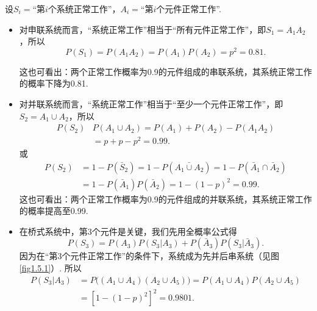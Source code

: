 \begin{solution}
    设$S_i=$“第$i$个系统正常工作”，$A_i=$“第$i$个元件正常工作”.

    \begin{itemize}[(1)]
        \item 对申联系统而言，“系统正常工作”相当于“所有元件正常工作”，即$S_1=A_1A_2$，所以
              \[
                  P(S_1) = P(A_1A_2) = P(A_1)P(A_2) = p^2 = 0.81.
              \]

              这也可看出：两个正常工作概率为0.9的元件组成的串联系统，其系统正常工作的概率下降为0.81.

        \item 对并联系统而言，“系统正常工作”相当于“至少一个元件正常工作”，即$S_2=A_1\cup A_2$，所以
              \begin{align*}
                  P(S_2) & P(A_1\cup A_2) = P(A_1) + P(A_2) - P(A_1A_2) \\
                         & = p + p - p^2 = 0.99.
              \end{align*}
              或
              \begin{align*}
                  P(S_2) & = 1 - P(\bar S_2) = 1 - P(\bar{A_1\cup A_2}) = 1 - P(\bar A_1\cap \bar A_2) \\
                         & = 1 - P(\bar A_1)P(\bar A_2) = 1 - (1-p)^2 = 0.99.
              \end{align*}
              这也可看出：两个正常工作概率为0.9的元件组成的并联系统，其系统正常工作的概率提高至0.99.

        \item 在桥式系统中，第3个元件是关键，我们先用全概率公式得
              \[
                  P(S_3) = P(A_3)P(S_3|A_3) + P(\bar A_3)P(S_3|\bar A_3).
              \]
              因为在“第3个元件正常工作”的条件下，系统成为先并后串系统（见图 \ref{fig1.5.1}）. 所以
              \begin{align*}
                  P(S_3|A_3) & = P\big( ( A_1\cup A_4 )
                  (A_2 \cup A_5) \big) = P(A_1\cup A_4)P(A_2\cup A_5) \\
                             & = [ 1 - (1-p)^2 ]^2 = 0.9801.
              \end{align*}


\end{itemize}
\end{solution}
